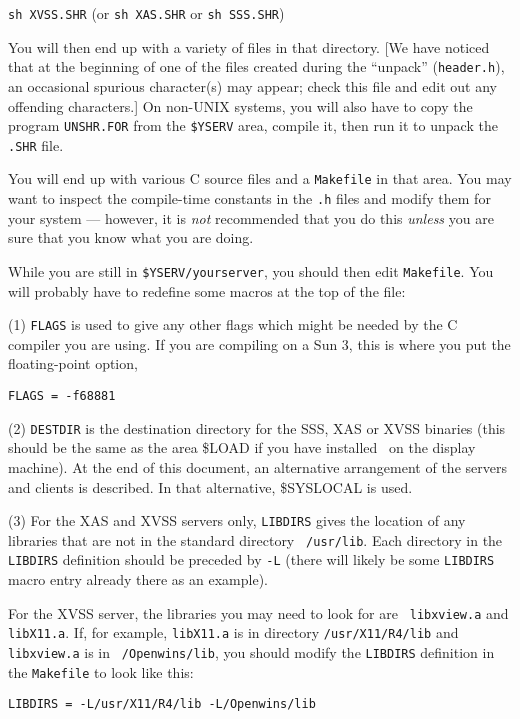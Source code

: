 \noindent
{\tt sh XVSS.SHR} (or {\tt sh XAS.SHR} or {\tt sh SSS.SHR})

\noindent

You will then end up with a variety of files in that directory.  [We have
noticed that at the beginning of one of the files created during the
``unpack'' ({\tt header.h}), an occasional spurious character(s) may appear;
check this file and edit out any offending characters.]  On non-UNIX systems,
you will also have to copy the program {\tt UNSHR.FOR} from the {\tt \$YSERV}
area, compile it, then run it to unpack the {\tt .SHR} file.

You will end up with various C source files and a {\tt Makefile} in that
area.  You may want to inspect the compile-time constants in the {\tt .h}
files and modify them for your system --- however, it is {\it not}
recommended that you do this {\it unless} you are sure that you know
what you are doing.

While you are still in {\tt \$YSERV/yourserver}, you should then edit
{\tt Makefile}.  You will probably have to redefine some macros at the
top of the file:

    (1) {\tt FLAGS} is used to give any other flags which might be
needed by the C compiler you are using.  If you are compiling on a Sun
3, this is where you put the floating-point option, \eg

\noindent
{\tt FLAGS = -f68881}

    (2) {\tt DESTDIR} is the destination directory for the SSS, XAS or
XVSS binaries (this should be the same as the area \$LOAD if you have
installed \AIPS\ on the display machine).  At the end of this
document, an alternative arrangement of the servers and clients is
described.  In that alternative, \$SYSLOCAL is used.

    (3) For the XAS and XVSS servers only, {\tt LIBDIRS} gives the
location of any libraries that are not in the standard directory {\tt
/usr/lib}.  Each directory in the {\tt LIBDIRS} definition should be
preceded by {\tt -L} (there will likely be some {\tt LIBDIRS} macro
entry already there as an example).

For the XVSS server, the libraries you may need to look for are {\tt
libxview.a} and {\tt libX11.a}.  If, for example, {\tt libX11.a} is in
directory {\tt /usr/X11/R4/lib} and {\tt libxview.a} is in {\tt
/Openwins/lib}, you should modify the {\tt LIBDIRS} definition in the
{\tt Makefile} to look like this:

\noindent
{\tt LIBDIRS = -L/usr/X11/R4/lib -L/Openwins/lib}

